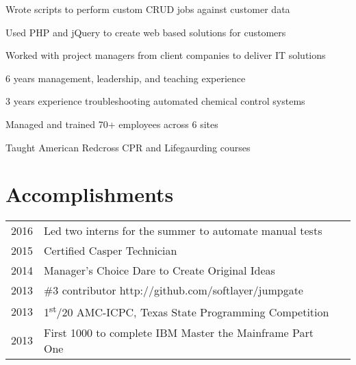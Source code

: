 \documentclass[letterpaper]{resume} %
\begin{document}
\begin{minipage}[t]{0.66\textwidth}
\sectionspace %



\begin{tightitemize}
\item Wrote scripts to perform custom CRUD jobs against customer data
\item Used PHP and jQuery to create web based solutions for customers
\item Worked with project managers from client companies to deliver IT solutions
\end{tightitemize}

\sectionspace %


\begin{tightitemize}
\item 6 years management, leadership, and teaching experience
\item 3 years experience troubleshooting automated chemical control systems
\item Managed and trained 70+ employees across 6 sites
\item Taught American Redcross CPR and Lifegaurding courses
\end{tightitemize}

\sectionspace %



\section{Accomplishments} 

\begin{tabular}{lll}
2016     & Led two interns for the summer to automate manual tests \\
2015     & Certified Casper Technician \\
2014	 & Manager's Choice Dare to Create Original Ideas\\
2013  & \#3 contributor http://github.com/softlayer/jumpgate \\
2013	 & 1\textsuperscript{st}/20 AMC-ICPC, Texas State Programming Competition\\
2013	 & First 1000 to complete IBM Master the Mainframe Part One\\
\end{tabular}
 

\end{minipage}
\end{document}
